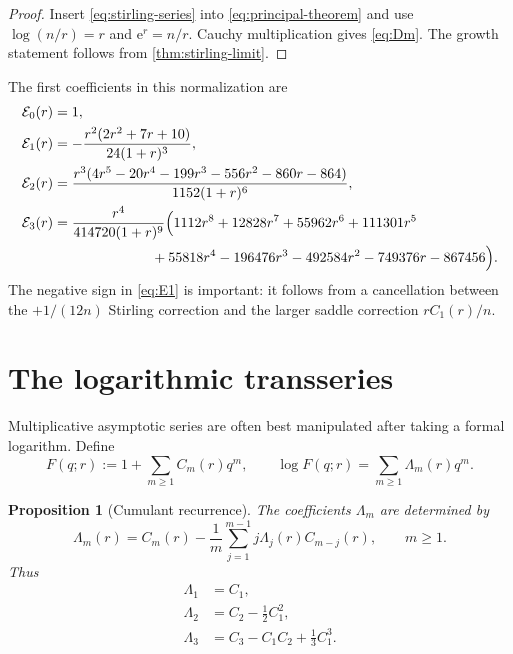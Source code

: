 \documentclass[11pt,a4paper]{article}
\newtheorem{proposition}[theorem]{Proposition}
\theoremstyle{definition}
\newcommand{\ee}{\mathrm e}
\newcommand{\cE}{\mathcal E}
\begin{document}
\begin{proof}
Insert \eqref{eq:stirling-series} into
\eqref{eq:principal-theorem} and use
$\log(n/r)=r$ and $\ee^r=n/r$.  Cauchy multiplication gives
\eqref{eq:Dm}.  The growth statement follows from
\cref{thm:stirling-limit}.
\end{proof}

The first coefficients in this normalization are
\begin{align}
 \cE_0(r)&=1,\label{eq:E0}\\
 \cE_1(r)&=-\frac{r^2(2r^2+7r+10)}{24(1+r)^3},\label{eq:E1}\\
 \cE_2(r)&=\frac{r^3(4r^5-20r^4-199r^3-556r^2-860r-864)}
 {1152(1+r)^6},\label{eq:E2}\\
 \cE_3(r)&=\frac{r^4}{414720(1+r)^9}
 \Bigl(1112r^8+12828r^7+55962r^6+111301r^5\notag\\
 &\hspace{7em}{}+55818r^4-196476r^3-492584r^2
 -749376r-867456\Bigr).\label{eq:E3}
\end{align}
The negative sign in \eqref{eq:E1} is important: it follows from a cancellation
between the $+1/(12n)$ Stirling correction and the larger saddle correction
$rC_1(r)/n$.

\section{The logarithmic transseries}

Multiplicative asymptotic series are often best manipulated after taking a
formal logarithm.  Define
\begin{equation}\label{eq:F-Lambda}
 F(q;r):=1+\sum_{m\ge1}C_m(r)q^m,
 \qquad
 \log F(q;r)=\sum_{m\ge1}\Lambda_m(r)q^m.
\end{equation}

\begin{proposition}[Cumulant recurrence]\label{prop:lambda-recurrence}
The coefficients $\Lambda_m$ are determined by
\begin{equation}\label{eq:lambda-recurrence}
 \Lambda_m(r)=C_m(r)-\frac1m
 \sum_{j=1}^{m-1}j\Lambda_j(r)C_{m-j}(r),
 \qquad m\ge1.
\end{equation}
Thus
\begin{align*}
 \Lambda_1&=C_1,\\
 \Lambda_2&=C_2-\frac12C_1^2,\\
 \Lambda_3&=C_3-C_1C_2+\frac13C_1^3.
\end{align*}
\end{proposition}
\end{document}
